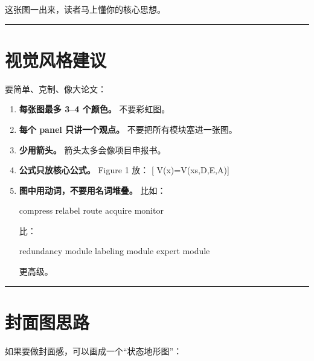 \documentclass[
  12pt,
]{ctexart}
\newenvironment{Shaded}{}{}
\newcommand{\NormalTok}[1]{#1}
\begin{document}
这张图一出来，读者马上懂你的核心思想。

\begin{center}\rule{0.5\linewidth}{0.5pt}\end{center}

\section{视觉风格建议}\label{ux89c6ux89c9ux98ceux683cux5efaux8bae}

要简单、克制、像大论文：

\begin{enumerate}
\def\labelenumi{\arabic{enumi}.}
\item
  \textbf{每张图最多 3--4 个颜色。} 不要彩虹图。
\item
  \textbf{每个 panel 只讲一个观点。} 不要把所有模块塞进一张图。
\item
  \textbf{少用箭头。} 箭头太多会像项目申报书。
\item
  \textbf{公式只放核心公式。} Figure 1 放： {[}
  V(x)=V(x\mid s,\mathcal D,\mathcal E,\mathcal A){]}
\item
  \textbf{图中用动词，不要用名词堆叠。} 比如：

\begin{Shaded}
\begin{Highlighting}[]
\NormalTok{compress}
\NormalTok{relabel}
\NormalTok{route}
\NormalTok{acquire}
\NormalTok{monitor}
\end{Highlighting}
\end{Shaded}

  比：

\begin{Shaded}
\begin{Highlighting}[]
\NormalTok{redundancy module}
\NormalTok{labeling module}
\NormalTok{expert module}
\end{Highlighting}
\end{Shaded}

  更高级。
\end{enumerate}

\begin{center}\rule{0.5\linewidth}{0.5pt}\end{center}

\section{封面图思路}\label{ux5c01ux9762ux56feux601dux8def}

如果要做封面感，可以画成一个``状态地形图''：
\end{document}
